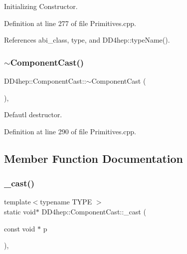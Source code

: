 Initializing Constructor. 



Definition at line 277 of file Primitives.\+cpp.



References abi\+\_\+class, type, and D\+D4hep\+::type\+Name().

\hypertarget{class_d_d4hep_1_1_component_cast_a1554d35b906921cba45fc717702ff8c4}{}\label{class_d_d4hep_1_1_component_cast_a1554d35b906921cba45fc717702ff8c4} 
\subsubsection{\texorpdfstring{$\sim$\+Component\+Cast()}{~ComponentCast()}}
{\footnotesize\ttfamily D\+D4hep\+::\+Component\+Cast\+::$\sim$\+Component\+Cast (\begin{DoxyParamCaption}{ }\end{DoxyParamCaption})\hspace{0.3cm}{\ttfamily [private]}, {\ttfamily [virtual]}}



Defautl destructor. 



Definition at line 290 of file Primitives.\+cpp.



\subsection{Member Function Documentation}
\hypertarget{class_d_d4hep_1_1_component_cast_afe17c403d3ff099be1d8b49fb3821d30}{}\label{class_d_d4hep_1_1_component_cast_afe17c403d3ff099be1d8b49fb3821d30} 
\subsubsection{\texorpdfstring{\+\_\+cast()}{\_cast()}}
{\footnotesize\ttfamily template$<$typename T\+Y\+PE $>$ \\
static void$\ast$ D\+D4hep\+::\+Component\+Cast\+::\+\_\+cast (\begin{DoxyParamCaption}\item[{const void $\ast$}]{p }\end{DoxyParamCaption})\hspace{0.3cm}{\ttfamily [inline]}, {\ttfamily [static]}}



